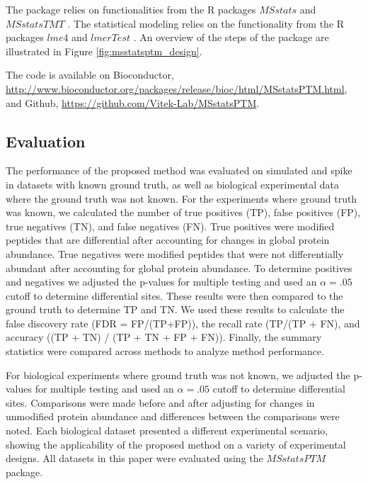 \documentclass[mcp]{article}
\numberwithin{table}{section}
\begin{document}
The package relies on functionalities from the R packages $MSstats$ \cite{Choi:2014} and $MSstatsTMT$ \cite{Huang:2020}. The statistical modeling relies on the functionality from the R packages $lme4$ \cite{Bates2015} and $lmerTest$ \cite{Kuznetsova2017}. An overview of the steps of the package are illustrated in Figure \ref{fig:msstatsptm_design}.

The code is available on Bioconductor, \url{http://www.bioconductor.org/packages/release/bioc/html/MSstatsPTM.html}, and Github, \url{https://github.com/Vitek-Lab/MSstatsPTM}.

\subsection*{Evaluation}

The performance of the proposed method was evaluated on simulated and spike in datasets with known ground truth, as well as biological experimental data where the ground truth was not known. For the experiments where ground truth was known, we calculated the number of true positives (TP), false positives (FP), true negatives (TN), and false negatives (FN). True positives were modified peptides that are differential after accounting for changes in global protein abundance. True negatives were modified peptides that were not differentially abundant after accounting for global protein abundance. To determine positives and negatives we adjusted the p-values for multiple testing and used an $\alpha=.05$ cutoff to determine differential sites. These results were then compared to the ground truth to determine TP and TN. We used these results to calculate the false discovery rate (FDR = FP/(TP+FP)), the recall rate (TP/(TP + FN), and accuracy ((TP + TN) / (TP + TN + FP + FN)). Finally, the summary statistics were compared across methods to analyze method performance. 

For biological experiments where ground truth was not known, we adjusted the p-values for multiple testing and used an $\alpha=.05$ cutoff to determine differential sites. Comparisons were made before and after adjusting for changes in unmodified protein abundance and differences between the comparisons were noted. Each biological dataset presented a different experimental scenario, showing the applicability of the proposed method on a variety of experimental designs. All datasets in this paper were evaluated using the $MSstatsPTM$ package.
\end{document}
